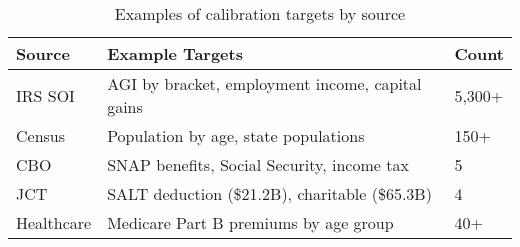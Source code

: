 \begin{table}[h]
    \centering
    \caption{Examples of calibration targets by source}
    \label{tab:target_examples}
    \begin{tabular}{lll}
    \toprule
    Source & Example Targets & Count \\
    \midrule
    IRS SOI & AGI by bracket, employment income, capital gains & 5,300+ \\
    Census & Population by age, state populations & 150+ \\
    CBO & SNAP benefits, Social Security, income tax & 5 \\
    JCT & SALT deduction (\$21.2B), charitable (\$65.3B) & 4 \\
    Healthcare & Medicare Part B premiums by age group & 40+ \\
    \bottomrule
    \end{tabular}
\end{table}
